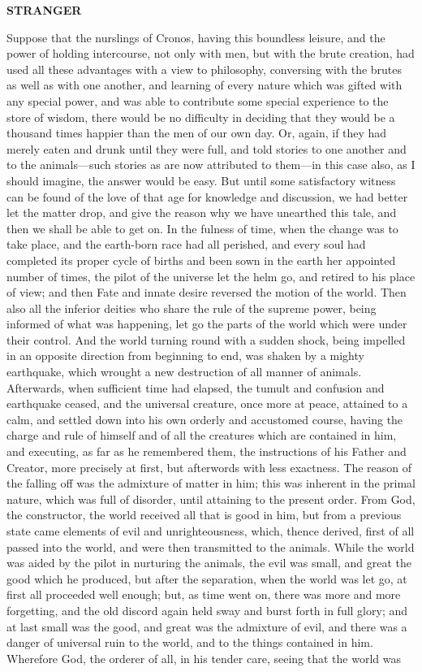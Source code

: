 \documentclass[11pt,letter]{article}
\begin{document}
\par \textbf{STRANGER}
\par   Suppose that the nurslings of Cronos, having this boundless leisure, and the power of holding intercourse, not only with men, but with the brute creation, had used all these advantages with a view to philosophy, conversing with the brutes as well as with one another, and learning of every nature which was gifted with any special power, and was able to contribute some special experience to the store of wisdom, there would be no difficulty in deciding that they would be a thousand times happier than the men of our own day. Or, again, if they had merely eaten and drunk until they were full, and told stories to one another and to the animals—such stories as are now attributed to them—in this case also, as I should imagine, the answer would be easy. But until some satisfactory witness can be found of the love of that age for knowledge and discussion, we had better let the matter drop, and give the reason why we have unearthed this tale, and then we shall be able to get on. In the fulness of time, when the change was to take place, and the earth-born race had all perished, and every soul had completed its proper cycle of births and been sown in the earth her appointed number of times, the pilot of the universe let the helm go, and retired to his place of view; and then Fate and innate desire reversed the motion of the world. Then also all the inferior deities who share the rule of the supreme power, being informed of what was happening, let go the parts of the world which were under their control. And the world turning round with a sudden shock, being impelled in an opposite direction from beginning to end, was shaken by a mighty earthquake, which wrought a new destruction of all manner of animals. Afterwards, when sufficient time had elapsed, the tumult and confusion and earthquake ceased, and the universal creature, once more at peace, attained to a calm, and settled down into his own orderly and accustomed course, having the charge and rule of himself and of all the creatures which are contained in him, and executing, as far as he remembered them, the instructions of his Father and Creator, more precisely at first, but afterwords with less exactness. The reason of the falling off was the admixture of matter in him; this was inherent in the primal nature, which was full of disorder, until attaining to the present order. From God, the constructor, the world received all that is good in him, but from a previous state came elements of evil and unrighteousness, which, thence derived, first of all passed into the world, and were then transmitted to the animals. While the world was aided by the pilot in nurturing the animals, the evil was small, and great the good which he produced, but after the separation, when the world was let go, at first all proceeded well enough; but, as time went on, there was more and more forgetting, and the old discord again held sway and burst forth in full glory; and at last small was the good, and great was the admixture of evil, and there was a danger of universal ruin to the world, and to the things contained in him. Wherefore God, the orderer of all, in his tender care, seeing that the world was 
\end{document}
